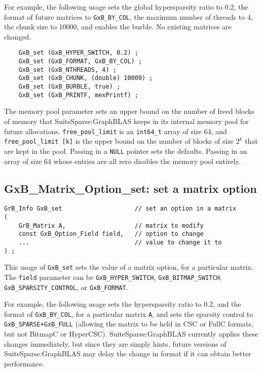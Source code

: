 \documentclass[12pt]{article}
\begin{document}
{For example, the following usage sets the global hypersparsity ratio to 0.2,
the format of future matrices to \verb'GxB_BY_COL', the maximum number
of threads to 4, the chunk size to 10000, and enables the burble.
No existing matrices are changed.

{\footnotesize
\begin{verbatim}
    GxB_set (GxB_HYPER_SWITCH, 0.2) ;
    GxB_set (GxB_FORMAT, GxB_BY_COL) ;
    GxB_set (GxB_NTHREADS, 4) ;
    GxB_set (GxB_CHUNK, (double) 10000) ;
    GxB_set (GxB_BURBLE, true) ;
    GxB_set (GxB_PRINTF, mexPrintf) ;
\end{verbatim} }

The memory pool parameter sets an upper bound on the number of freed blocks of
memory that SuiteSparse:GraphBLAS keeps in its internal memory pool for future
allocations.   \verb'free_pool_limit'  is an \verb'int64_t' array of size 64,
and \verb'free_pool_limit [k]' is the upper bound on the number of blocks
of size $2^k$ that are kept in the pool.  Passing in a \verb'NULL' pointer
sets the defaults.  Passing in an array of size 64 whose entries are all zero
disables the memory pool entirely.

\subsection{{\sf GxB\_Matrix\_Option\_set:} set a matrix option}

\begin{mdframed}[userdefinedwidth=6in]
{\footnotesize
\begin{verbatim}
GrB_Info GxB_set                    // set an option in a matrix
(
    GrB_Matrix A,                   // matrix to modify
    const GxB_Option_Field field,   // option to change
    ...                             // value to change it to
) ;
\end{verbatim} } \end{mdframed}

This usage of \verb'GxB_set' sets the value of a matrix option, for a
particular matrix.
The \verb'field' parameter can be
\verb'GxB_HYPER_SWITCH',
\verb'GxB_BITMAP_SWITCH',
\verb'GxB_SPARSITY_CONTROL', or
\verb'GxB_FORMAT'.

For example, the following usage sets the hypersparsity ratio to 0.2, and the
format of \verb'GxB_BY_COL', for a particular matrix \verb'A', and sets the
sparsity control to \verb'GxB_SPARSE+GxB_FULL' (allowing the matrix to be held
in CSC or FullC formats, but not BitmapC or HyperCSC).  SuiteSparse:GraphBLAS
currently applies these changes immediately, but since they are simply hints,
future versions of SuiteSparse:GraphBLAS may delay the change in format if it
can obtain better performance.

}
\end{document}
